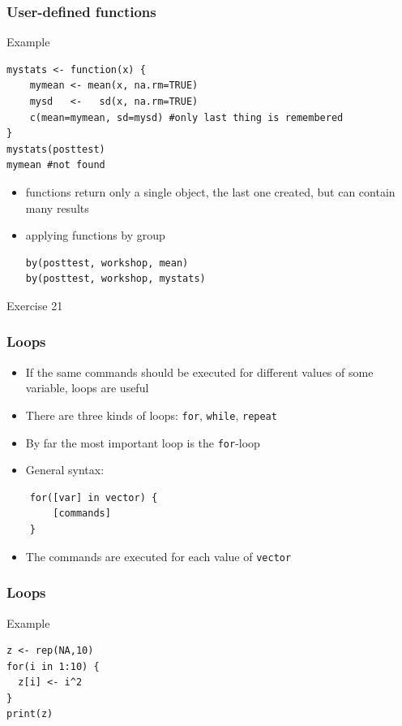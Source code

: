 \documentclass[xcolor={svgnames},10pt,
handout
]{beamer}
\begin{document}
\begin{frame}[fragile]
\frametitle{User-defined functions}
Example
\begin{lstlisting}
mystats <- function(x) {
	mymean <- mean(x, na.rm=TRUE)
	mysd   <-   sd(x, na.rm=TRUE)
	c(mean=mymean, sd=mysd) #only last thing is remembered
}
mystats(posttest)
mymean #not found
\end{lstlisting}
\begin{itemize}
\item functions return only a single object, the last one created, but can contain many results
\item applying functions by group
\begin{lstlisting}
by(posttest, workshop, mean)
by(posttest, workshop, mystats)
\end{lstlisting}
\end{itemize}
\end{frame}


\begin{frame}[standout]
Exercise 21
\end{frame}




\begin{frame}[fragile]
\frametitle{Loops}
\begin{itemize}
\item If the same commands should be executed for different values of some
variable, loops are useful
\item There are three kinds of loops: \texttt{for}, \texttt{while}, \texttt{repeat}
\item By far the most important loop is the \texttt{for}-loop
\item General syntax:
\end{itemize}
\begin{verbatim}
    for([var] in vector) {
        [commands]
    }
\end{verbatim}
\begin{itemize}
\item The commands are executed for each value of \texttt{vector}
\end{itemize}
\end{frame}


\begin{frame}[fragile]
\frametitle{Loops}
Example
\begin{lstlisting}
z <- rep(NA,10)
for(i in 1:10) {
  z[i] <- i^2
}
print(z)
\end{lstlisting}
\end{frame}
\end{document}
